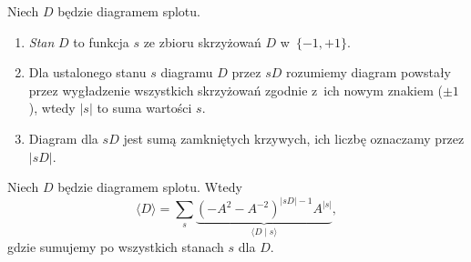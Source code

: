 \begin{definition}
    Niech $D$ będzie diagramem splotu.
    \begin{enumerate}
        \item \emph{Stan} $D$ to funkcja $s$ ze zbioru skrzyżowań $D$ w~$\{-1, +1\}$.
        \item Dla ustalonego stanu $s$ diagramu $D$ przez $sD$ rozumiemy diagram powstały przez wygładzenie
        wszystkich skrzyżowań zgodnie z~ich nowym znakiem ($\pm 1$), wtedy $|s|$ to suma wartości $s$.
        \item Diagram dla $sD$ jest sumą zamkniętych krzywych, ich liczbę oznaczamy przez $|sD|$.
    \end{enumerate}
\end{definition}

\begin{proposition}
    Niech $D$ będzie diagramem splotu.
    Wtedy
    \begin{equation}
        \langle D\rangle = \sum_s \underbrace{(-A^2-A^{-2})^{|sD|-1} A^{|s|}}_{\langle D \mid s \rangle},
    \end{equation}
    gdzie sumujemy po wszystkich stanach $s$ dla $D$.
\end{proposition}

